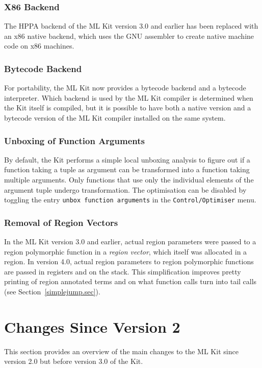 \documentclass[12pt]{book}
\begin{document}
\subsubsection*{X86 Backend}
The 
%
HPPA backend of the ML Kit version 3.0 and earlier has been replaced
with an
%
x86 native backend, which uses the GNU assembler to create native
machine code on x86 machines.

\subsubsection*{Bytecode Backend}
%
For portability, the ML Kit now provides a bytecode backend and a
bytecode interpreter. Which backend is used by the ML Kit compiler is
determined when the Kit itself is compiled, but it is possible to have
both a native version and a bytecode version of the ML Kit compiler
installed on the same system.

\subsubsection*{Unboxing of Function Arguments}
%
%
%
By default, the Kit performs a simple local unboxing analysis to
figure out if a function taking a tuple as argument can be transformed
into a function taking multiple arguments. Only functions that use
only the individual elements of the argument tuple undergo
transformation. The optimisation can be disabled by toggling the entry
{\tt unbox function arguments} in the {\tt Control/Optimiser} menu.

\subsubsection*{Removal of Region Vectors}
%
In the ML Kit version 3.0 and earlier, actual region parameters were
passed to a region polymorphic function in a {\em region vector},
which itself was allocated in a region. In version 4.0, actual region
parameters to
%
region polymorphic functions are passed in registers and on the stack.
This simplification improves pretty printing of region annotated terms
and on what function calls turn into tail calls (see
Section~\ref{simplejump.sec}).

\section{Changes Since Version 2}
%
This section provides an overview of the main changes to the ML Kit
since version 2.0 but before version 3.0 of the Kit.
\end{document}
